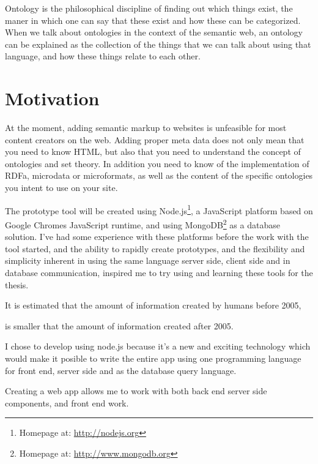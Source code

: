 Ontology is the philosophical discipline of finding out which things exist, 
the maner in which one can say that these exist and how these can be categorized. 
When we talk about ontologies in the context of the semantic web, 
an ontology can be explained as the collection of the things that we can talk about using that language, 
and how these things relate to each other.


\section{Motivation}
At the moment, adding semantic markup to websites is unfeasible for most content creators on the web.
Adding proper meta data does not only mean that you need to know HTML, 
but also that you need to understand the concept of ontologies and set theory. 
In addition you need to know of the implementation of RDFa, microdata or microformats, 
as well as the content of the specific ontologies you intent to use on your site.


The prototype tool will be created using Node.js\footnote{Homepage at: \url{http://nodejs.org}}, 
a JavaScript platform based on Google Chromes JavaScript runtime, 
and using MongoDB\footnote{Homepage at: \url{http://www.mongodb.org}} as a database solution.
I've had some experience with these platforms before the work with the tool started, 
and the ability to rapidly create prototypes, and the flexibility and simplicity inherent in using the same language
server side, client side and in database communication, inspired me to try using and learning these tools for the thesis.

It is estimated that the amount of information created by humans before 2005, 

is smaller that the amount of information created after 2005.

I chose to develop using node.js because it's a new and exciting technology which would make it posible to write the entire app using one programming language for front end, 
server side and as the database query language.

Creating a web app allows me to work with both back end server side components, 
and front end work. 

